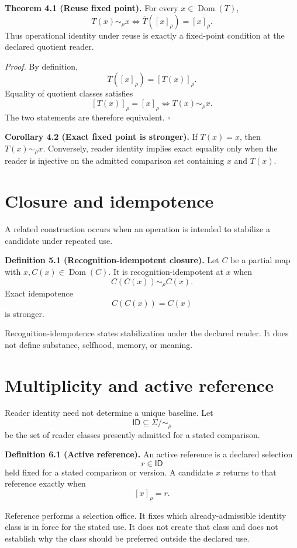 \documentclass[11pt]{article}
\newcommand{\Dom}{\operatorname{Dom}}
\newcommand{\ID}{\mathsf{ID}}
\begin{document}
\textbf{Theorem 4.1 (Reuse fixed point).}
For every $x\in\Dom(T)$,
\[
\boxed{
T(x)\sim_\rho x
\iff
\overline T([x]_\rho)=[x]_\rho.
}
\]
Thus operational identity under reuse is exactly a fixed-point condition at the declared quotient reader.

\textit{Proof.}
By definition,
\[
\overline T([x]_\rho)=[T(x)]_\rho.
\]
Equality of quotient classes satisfies
\[
[T(x)]_\rho=[x]_\rho
\iff
T(x)\sim_\rho x.
\]
The two statements are therefore equivalent. $\square$

\textbf{Corollary 4.2 (Exact fixed point is stronger).}
If $T(x)=x$, then $T(x)\sim_\rho x$. Conversely, reader identity implies exact equality only when the reader is injective on the admitted comparison set containing $x$ and $T(x)$.

\section{Closure and idempotence}

A related construction occurs when an operation is intended to stabilize a candidate under repeated use.

\textbf{Definition 5.1 (Recognition-idempotent closure).}
Let $C$ be a partial map with $x,C(x)\in\Dom(C)$. It is recognition-idempotent at $x$ when
\[
\boxed{C(C(x))\sim_\rho C(x).}
\]
Exact idempotence
\[
C(C(x))=C(x)
\]
is stronger.

Recognition-idempotence states stabilization under the declared reader. It does not define substance, selfhood, memory, or meaning.

\section{Multiplicity and active reference}

Reader identity need not determine a unique baseline. Let
\[
\ID\subseteq \Sigma/{\sim_\rho}
\]
be the set of reader classes presently admitted for a stated comparison.

\textbf{Definition 6.1 (Active reference).}
An active reference is a declared selection
\[
r\in\ID
\]
held fixed for a stated comparison or version. A candidate $x$ returns to that reference exactly when
\[
[x]_\rho=r.
\]

Reference performs a selection office. It fixes which already-admissible identity class is in force for the stated use. It does not create that class and does not establish why the class should be preferred outside the declared use.
\end{document}
